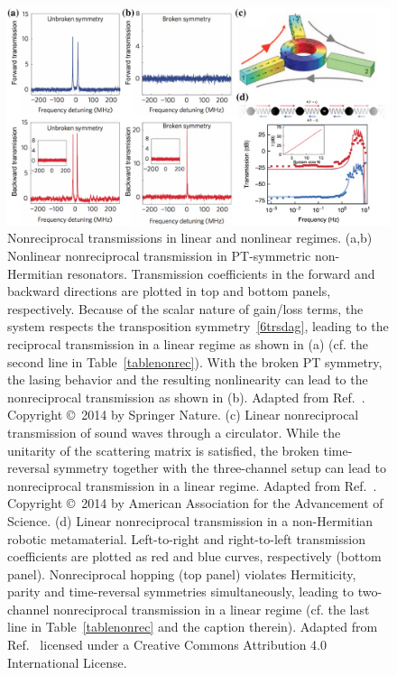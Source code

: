 \documentclass{tADP2e}
\theoremstyle{plain}
\theoremstyle{plain}
\theoremstyle{definition}
\begin{document}
\begin{figure}[!t]
\begin{center}
\includegraphics[width=14cm]{./Figures/fig_6_nonrecip.pdf}
\end{center}
\caption{Nonreciprocal transmissions in linear and nonlinear regimes. (a,b)  Nonlinear nonreciprocal transmission in PT-symmetric non-Hermitian resonators. Transmission coefficients in the forward and backward directions are plotted in top and bottom panels, respectively. Because of the scalar nature of gain/loss terms, the system respects the transposition symmetry~\eqref{6trsdag}, leading to the reciprocal transmission in a linear regime as shown in (a) (cf. the second line in Table~\ref{tablenonrec}). With the broken PT symmetry, the lasing behavior and the resulting nonlinearity can lead to the nonreciprocal transmission as shown in (b). Adapted from Ref.~\cite{BP14}. Copyright \copyright\,  2014 by Springer Nature.  (c) Linear nonreciprocal transmission of sound waves through a circulator. While the unitarity of the scattering matrix is satisfied, the broken time-reversal symmetry together with the three-channel setup can lead to nonreciprocal transmission in a linear regime. Adapted from Ref.~\cite{Fleury516}. Copyright \copyright\,  2014 by American Association for the Advancement of Science.  
(d) Linear nonreciprocal transmission in a non-Hermitian robotic metamaterial. Left-to-right and right-to-left transmission coefficients are plotted as red and blue curves, respectively (bottom panel). Nonreciprocal hopping (top panel) violates Hermiticity, parity and time-reversal symmetries simultaneously, leading to two-channel nonreciprocal transmission in a linear regime (cf. the last line in Table~\ref{tablenonrec} and the caption therein). Adapted from Ref.~\cite{BM19} licensed under a Creative Commons Attribution 4.0 International License.}
\label{fig:6nonrecip}
\end{figure}
\end{document}
